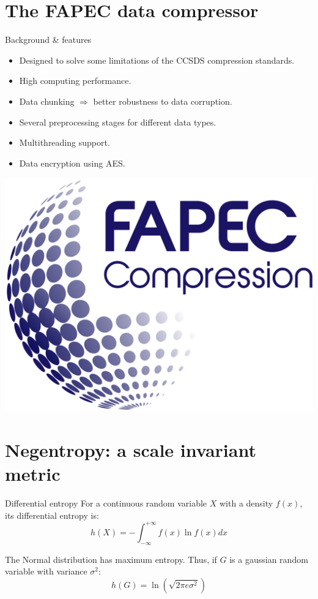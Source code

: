 \documentclass[usenames,dvipsnames]{beamer}
\begin{document}
\section{The FAPEC data compressor}
\begin{frame}{Background \& features}
\begin{itemize}
	\item<1-> Designed to solve some limitations of the CCSDS compression standards.
	\item<1-> High computing performance.
	\item<2-> Data chunking $\Rightarrow$ better robustness to data corruption.
	\item<2-> Several preprocessing stages for different data types.
	\item<3-> Multithreading support.
	\item<3-> Data encryption using AES.
\end{itemize}
\vspace{2.5em}
\hfill\includegraphics[scale=0.08]{graphics/FAPEC.png}
\end{frame}

\section{Negentropy: a scale invariant metric}
\begin{frame}{Differential entropy}
For a continuous random variable $X$ with a density $f(x)$, its differential entropy is:
\[
h(X) = - \int_{-\infty}^{+\infty} f(x) \ln f(x) dx
\]

The Normal distribution has maximum entropy. Thus, if $G$ is a gaussian random variable with variance $\sigma^2$:
\[
h(G) = \ln \left(\sqrt{2 \pi e \sigma^2}\right)
\]
\end{frame}
\end{document}
